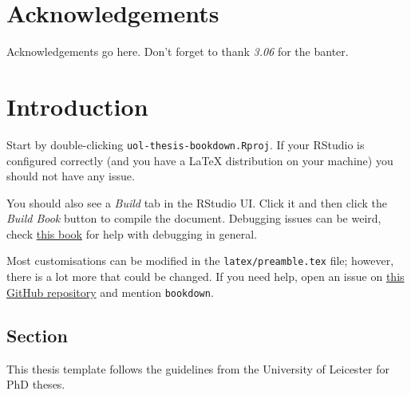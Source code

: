 \documentclass[
  12pt,
  oneside]{book}
\begin{document}
\cleardoublepage

\chapter*{Acknowledgements}
{}


Acknowledgements go here.
Don't forget to thank \emph{3.06} for the banter.


\cleardoublepage


\renewcommand{\contentsname}{Table of Contents}
\tableofcontents

\listoffigures

\listoftables


\cleardoublepage

\mainmatter

\hypertarget{intro}{%
\chapter{Introduction}\label{intro}}

Start by double-clicking \texttt{uol-thesis-bookdown.Rproj}.
If your RStudio is configured correctly (and you have a \LaTeX{} distribution on your machine) you should not have any issue.

You should also see a \emph{Build} tab in the RStudio UI.
Click it and then click the \emph{Build Book} button to compile the document.
Debugging issues can be weird, check \href{https://www.goodreads.com/en/book/show/29437996-copying-and-pasting-from-stack-overflow}{this book} for help with debugging in general.

Most customisations can be modified in the \texttt{latex/preamble.tex} file; however, there is a lot more that could be changed.
If you need help, open an issue on \href{https://github.com/ellessenne/uol-thesis}{this GitHub repository} and mention \texttt{bookdown}.

\hypertarget{intro-section}{%
\section{Section}\label{intro-section}}

This thesis template follows the guidelines from the University of Leicester for PhD theses.
\end{document}
